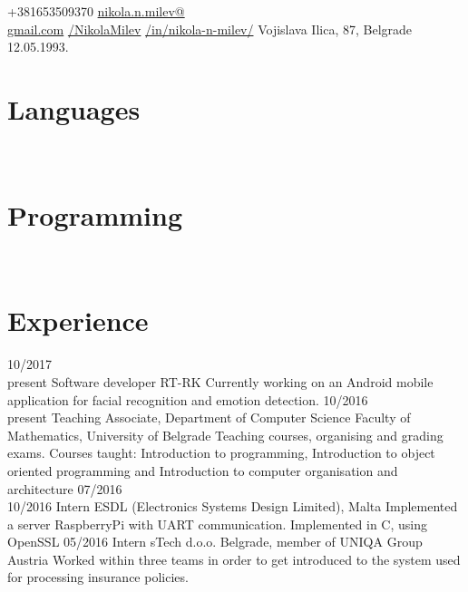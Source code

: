 \documentclass[a4paper]{my_cv}
\begin{document}
\thispagestyle{empty}	
	{+381653509370}
 	{\href{mailto:nikola.n.milev@gmail.com}{nikola.n.milev@\\gmail.com}}
	{ \href{https://github.com/NikolaMilev}{/NikolaMilev}} 	
 	{ \href{https://www.linkedin.com/in/nikola-n-milev/}{/in/nikola-n-milev/}}
	{ Vojislava Ilica, 87, Belgrade }
	{12.05.1993.}


 
\begin{aside}
\section{Languages}
\bodyfont{}
~
~
\section{Programming}
\end {aside}
~
~\\
\section{Experience}
\begin{entrylist}
\entry
    {10/2017~\textemdash \\present}
    {Software developer}
    {RT-RK}
    {Currently working on an Android mobile application for facial recognition and emotion detection.}
\entry
    {10/2016~\textemdash \\present}
    {Teaching Associate, Department of Computer Science}
    {Faculty of Mathematics, University of Belgrade}
    {Teaching courses, organising and grading exams. Courses taught: Introduction to programming, Introduction to object oriented programming and Introduction to computer organisation and architecture}
\entry
    {07/2016~\textemdash \\10/2016}
    {Intern}
    {ESDL (Electronics Systems Design Limited), Malta}
    {Implemented a server RaspberryPi with UART communication. Implemented in C, using OpenSSL}
\entry
    {05/2016}
    {Intern}
    {sTech d.o.o. Belgrade, member of UNIQA Group Austria}
    {Worked within three teams in order to get introduced to the system used for processing insurance policies. }
\end{entrylist}
\end{document}
